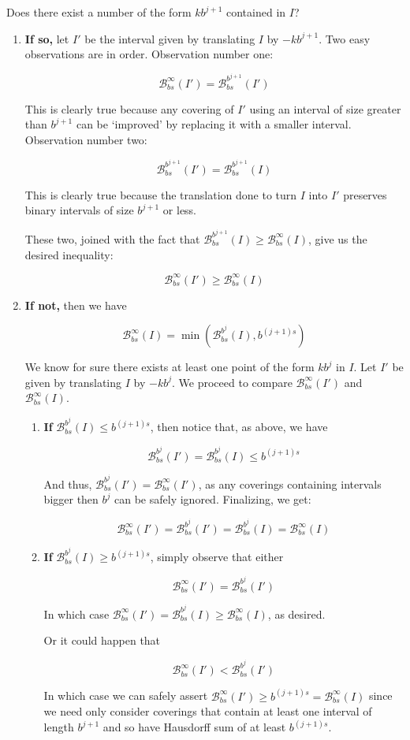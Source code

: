 \documentclass[11pt]{amsart}
\newcommand{\BB}{\mathcal{B}}
\begin{document}
Does there exist a number of the form $k b^{j+1}$ contained in $I$?
\begin{enumerate}

\item \textbf{If so,} let $I'$ be the interval given by translating $I$ by $-k b^{j+1}$. Two easy observations are in order. Observation number one:

\[\BB_{bs}^\infty(I') = \BB_{bs}^{b^{j+1}}(I')\]

This is clearly true because any covering of $I'$ using an interval of size greater than $b^{j+1}$ can be `improved' by replacing it with a smaller interval. Observation number two:

\[\BB_{bs}^{b^{j+1}}(I') = \BB_{bs}^{b^{j+1}}(I)\]

This is clearly true because the translation done to turn $I$ into $I'$ preserves binary intervals of size $b^{j+1}$ or less.

These two, joined with the fact that $\BB_{bs}^{b^{j+1}}(I) \geq \BB_{bs}^\infty(I)$, give us the desired inequality:

\[\BB_{bs}^\infty(I') \geq \BB_{bs}^\infty(I)\]

\item \textbf{If not,} then we have

\[\BB_{bs}^\infty(I) = \min(\BB_{bs}^{b^j}(I), b^{(j+1)s})\]

We know for sure there exists at least one point of the form $k b^j$ in $I$. Let $I'$ be given by translating $I$ by $-k b^j$. We proceed to compare $\BB_{bs}^\infty(I')$ and $\BB_{bs}^\infty(I)$.

\begin{enumerate}

\item \textbf{If} $\BB_{bs}^{b^j}(I) \leq b^{(j+1)s}$, then notice that, as above, we have

\[\BB_{bs}^{b^j}(I') = \BB_{bs}^{b^j}(I) \leq b^{(j+1)s}\]

And thus, $\BB_{bs}^{b^j}(I') = \BB_{bs}^\infty(I')$, as any coverings containing intervals bigger then $b^j$ can be safely ignored. Finalizing, we get:

\[\BB_{bs}^\infty(I') = \BB_{bs}^{b^j}(I') = \BB_{bs}^{b^j}(I) = \BB_{bs}^\infty(I)\]

\item \textbf{If} $\BB_{bs}^{b^j}(I) \geq b^{(j+1)s}$, simply observe that either

\[\BB_{bs}^\infty(I') = \BB_{bs}^{b^j}(I')\]

In which case $\BB_{bs}^\infty(I') = \BB_{bs}^{b^j}(I) \geq \BB_{bs}^\infty(I)$, as desired.

Or it could happen that

\[\BB_{bs}^\infty(I') < \BB_{bs}^{b^j}(I')\]

In which case we can safely assert $\BB_{bs}^\infty(I') \geq b^{(j+1)s} = \BB_{bs}^\infty(I)$ since we need only consider coverings that contain at least one interval of length $b^{j+1}$ and so have Hausdorff sum of at least $b^{(j+1)s}$.
\end{enumerate}
\end{enumerate}
\end{document}
